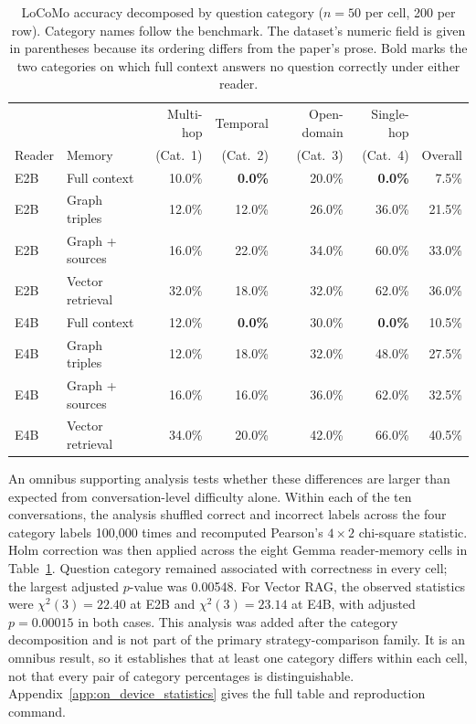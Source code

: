 \begin{table}[htbp]
  \centering
  \small
  \setlength{\tabcolsep}{5pt}
  \begin{tabular}{llrrrrr}
    \toprule
    & & Multi-hop & Temporal & Open-domain & Single-hop & \\
    Reader & Memory & (Cat.~1) & (Cat.~2) & (Cat.~3) & (Cat.~4) & Overall \\
    \midrule
    E2B & Full context     & 10.0\% & \textbf{0.0\%} & 20.0\% & \textbf{0.0\%} & 7.5\% \\
    E2B & Graph triples    & 12.0\% & 12.0\% & 26.0\% & 36.0\% & 21.5\% \\
    E2B & Graph + sources  & 16.0\% & 22.0\% & 34.0\% & 60.0\% & 33.0\% \\
    E2B & Vector retrieval & 32.0\% & 18.0\% & 32.0\% & 62.0\% & 36.0\% \\
    \midrule
    E4B & Full context     & 12.0\% & \textbf{0.0\%} & 30.0\% & \textbf{0.0\%} & 10.5\% \\
    E4B & Graph triples    & 12.0\% & 18.0\% & 32.0\% & 48.0\% & 27.5\% \\
    E4B & Graph + sources  & 16.0\% & 16.0\% & 36.0\% & 62.0\% & 32.5\% \\
    E4B & Vector retrieval & 34.0\% & 20.0\% & 42.0\% & 66.0\% & 40.5\% \\
    \bottomrule
  \end{tabular}
  \caption{LoCoMo accuracy decomposed by question category ($n=50$ per cell, 200 per row).
           Category names follow the benchmark. The dataset's numeric field is given in
           parentheses because its ordering differs from the paper's prose. Bold marks the two
           categories on which full context answers no question correctly under either reader.}
  \label{tab:ch4_locomo_categories}
\end{table}

An omnibus supporting analysis tests whether these differences are larger than expected
from conversation-level difficulty alone. Within each of the ten conversations, the
analysis shuffled correct and incorrect labels across the four category labels 100,000
times and recomputed Pearson's $4\times2$ chi-square statistic. Holm correction was then
applied across the eight Gemma reader-memory cells in
Table~\ref{tab:ch4_locomo_categories}. Question category remained associated with
correctness in every cell; the largest adjusted $p$-value was 0.00548. For Vector RAG,
the observed statistics were $\chi^2(3)=22.40$ at E2B and $\chi^2(3)=23.14$ at E4B,
with adjusted $p=0.00015$ in both cases. This analysis was added after the category
decomposition and is not part of the primary strategy-comparison family. It is an
omnibus result, so it establishes that at least one category differs within each cell,
not that every pair of category percentages is distinguishable. Appendix~\ref{app:on_device_statistics} gives the full table and reproduction command.

